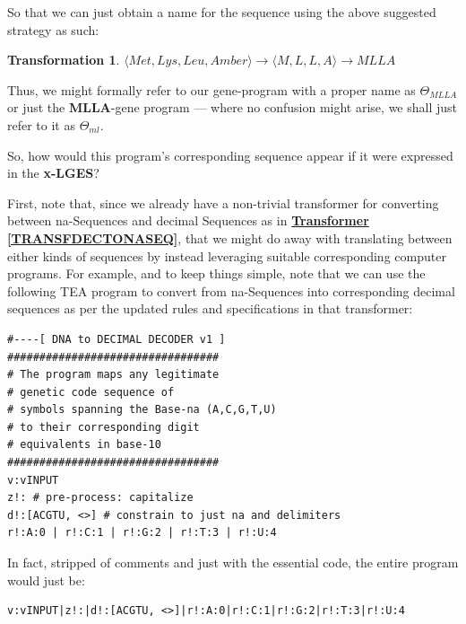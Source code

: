 \documentclass[a4paper, 18pt]{book} %
\newtheorem{trans}{Transformation}
\begin{document}
So that we can just obtain a name for the sequence using the above suggested strategy as such:

\begin{trans}
$\langle Met, Lys, Leu, Amber \rangle \rightarrow \langle M, L, L, A \rangle \rightarrow MLLA$
\end{trans}

Thus, we might formally refer to our gene-program with a proper name as $\Theta_{MLLA}$ or just the \textbf{MLLA}-gene program --- where no confusion might arise, we shall just refer to it as $\Theta_{ml}$. 

So, how would this program's corresponding sequence appear if it were expressed in the \textbf{x-LGES}?

First, note that, since we already have a non-trivial transformer for converting between na-Sequences and decimal Sequences as in \textbf{\hyperref[TRANSFDECTONASEQ]{Transformer \ref{TRANSFDECTONASEQ}}}, that we might do away with translating between either kinds of sequences by instead leveraging suitable corresponding computer programs. For example, and to keep things simple, note that we can use the following TEA program to convert from na-Sequences into corresponding decimal sequences as per the updated rules and specifications in that transformer:


\vspace{2em}
  \begin{tcolorbox}[teaterminalstyle, title=GENETICS: GENETIC to DECIMAL CODE TRANSFORMER (v1)]
  \begin{lstlisting}[language=TEA, label=LSTGEN2DEC,caption=GEN2DEC in TEA]
#----[ DNA to DECIMAL DECODER v1 ]
#################################
# The program maps any legitimate
# genetic code sequence of
# symbols spanning the Base-na (A,C,G,T,U)
# to their corresponding digit 
# equivalents in base-10
#################################
v:vINPUT
z!: # pre-process: capitalize 
d!:[ACGTU, <>] # constrain to just na and delimiters
r!:A:0 | r!:C:1 | r!:G:2 | r!:T:3 | r!:U:4
   \end{lstlisting}
  \end{tcolorbox}
\vspace{2em}

In fact, stripped of comments and just with the essential code, the entire program would just be:


\vspace{2em}
  \begin{tcolorbox}[teaterminalstyle, title=GENETIC to DECIMAL CODE TRANSFORMER (minified)]
  \begin{lstlisting}[language=TEA]
v:vINPUT|z!:|d!:[ACGTU, <>]|r!:A:0|r!:C:1|r!:G:2|r!:T:3|r!:U:4
   \end{lstlisting}
  \end{tcolorbox}
\vspace{2em}
\end{document}
